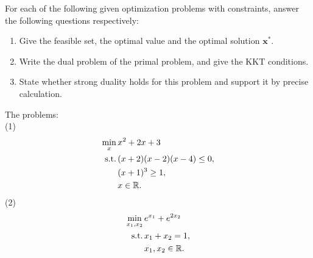 \documentclass[11pt,letter,notitlepage]{article}
\begin{document}
\begin{exercise}
    For each of the following given optimization problems with constraints, answer the following questions respectively:
    \begin{enumerate}
        \item Give the feasible set, the optimal value and the optimal solution $\mathbf{x}^*$.
        \item Write the dual problem of the primal problem, and give the KKT conditions.
        \item State whether strong duality holds for this problem and support it by precise calculation.
    \end{enumerate}
    The problems:\\
    (1)
    \begin{align*}
        \min_x\,& x^2+2x+3\\
        {\rm s.t.}\,& (x+2)(x-2)(x-4)\le 0,\\
        & (x+1)^3 \geq 1,\\
        & x\in\mathbb{R}.
    \end{align*}
    (2)
    \begin{align*}
        \min_{x_1, x_2}\,& e^{x_1}+e^{2x_2}\\
        {\rm s.t.}\,& x_1+x_2=1,\\
        & x_1, x_2\in\mathbb{R}.
    \end{align*}
\end{exercise}
\begin{solution}

\end{solution}
\end{document}
